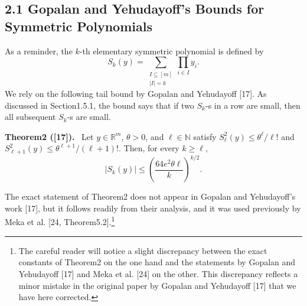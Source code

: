 \documentclass[10pt,a4paper]{article}
\newenvironment{authorclaim}[1]{\par\medskip\noindent\textbf{#1.}\ \ignorespaces}{\par\medskip}
\begin{document}
\subsection*{2.1 Gopalan and Yehudayoff's Bounds for Symmetric Polynomials}
As a reminder, the $k$-th elementary symmetric polynomial is defined by
\[
S_k(y)=\sum_{\substack{I\subseteq[m]\\|I|=k}}\prod_{i\in I}y_i.
\]
We rely on the following tail bound by Gopalan and Yehudayoff [17]. As discussed in Section1.5.1, the bound says that if two $S_k$-s in a row are small, then all subsequent $S_k$-s are small.
\begin{authorclaim}{Theorem2 ([17])}
Let $y\in\mathbb R^m$, $\theta>0$, and $\ell\in\mathbb N$ satisfy $S_\ell^2(y)\le\theta^\ell/\ell!$ and $S_{\ell+1}^2(y)\le\theta^{\ell+1}/(\ell+1)!$. Then, for every $k\ge\ell$,
\[
|S_k(y)|\le\left(\frac{64e^2\theta\ell}{k}\right)^{k/2}.
\]
\end{authorclaim}
The exact statement of Theorem2 does not appear in Gopalan and Yehudayoff's work [17], but it follows readily from their analysis, and it was used previously by Meka et al. [24, Theorem5.2].\footnote{The careful reader will notice a slight discrepancy between the exact constants of Theorem2 on the one hand and the statements by Gopalan and Yehudayoff [17] and Meka et al. [24] on the other. This discrepancy reflects a minor mistake in the original paper by Gopalan and Yehudayoff [17] that we have here corrected.}
\end{document}
